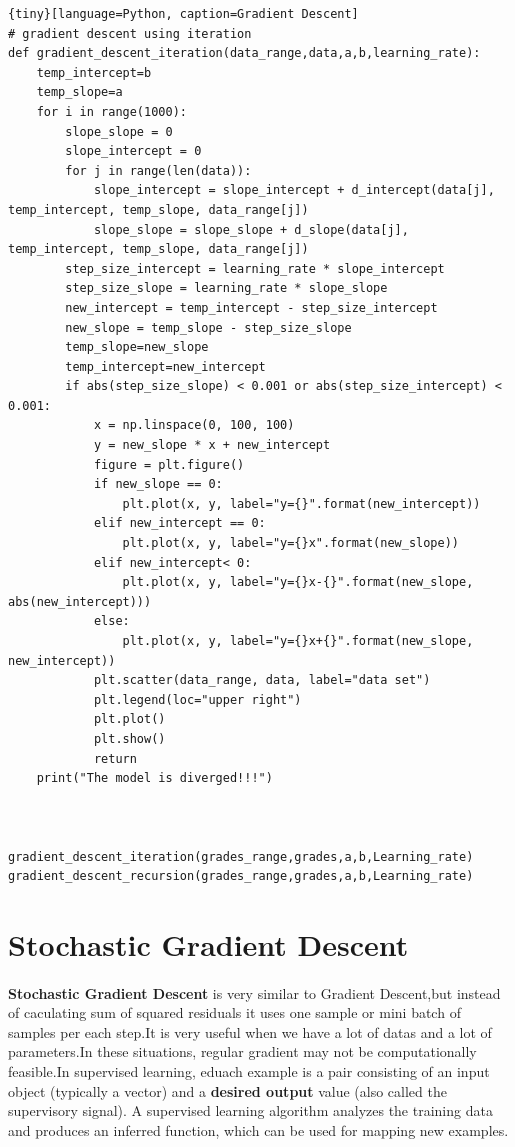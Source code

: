 \documentclass[a4paper,12pt]{article}
\begin{document}
\begin{spacing}{2}
\begin{tiny}
\begin{lstlisting}{tiny}[language=Python, caption=Gradient Descent]
# gradient descent using iteration
def gradient_descent_iteration(data_range,data,a,b,learning_rate):
    temp_intercept=b
    temp_slope=a
    for i in range(1000):
        slope_slope = 0
        slope_intercept = 0
        for j in range(len(data)):
            slope_intercept = slope_intercept + d_intercept(data[j], temp_intercept, temp_slope, data_range[j])
            slope_slope = slope_slope + d_slope(data[j], temp_intercept, temp_slope, data_range[j])
        step_size_intercept = learning_rate * slope_intercept
        step_size_slope = learning_rate * slope_slope
        new_intercept = temp_intercept - step_size_intercept
        new_slope = temp_slope - step_size_slope
        temp_slope=new_slope
        temp_intercept=new_intercept
        if abs(step_size_slope) < 0.001 or abs(step_size_intercept) < 0.001:
            x = np.linspace(0, 100, 100)
            y = new_slope * x + new_intercept
            figure = plt.figure()
            if new_slope == 0:
                plt.plot(x, y, label="y={}".format(new_intercept))
            elif new_intercept == 0:
                plt.plot(x, y, label="y={}x".format(new_slope))
            elif new_intercept< 0:
                plt.plot(x, y, label="y={}x-{}".format(new_slope, abs(new_intercept)))
            else:
                plt.plot(x, y, label="y={}x+{}".format(new_slope, new_intercept))
            plt.scatter(data_range, data, label="data set")
            plt.legend(loc="upper right")
            plt.plot()
            plt.show()
            return
    print("The model is diverged!!!")



gradient_descent_iteration(grades_range,grades,a,b,Learning_rate)
gradient_descent_recursion(grades_range,grades,a,b,Learning_rate)
\end{lstlisting}
\end{tiny}
\section{Stochastic Gradient Descent}
\paragraph{ }\textbf{Stochastic Gradient Descent} is very similar to Gradient Descent,but instead of caculating sum of squared residuals it uses one sample or mini batch of samples per each step.It is very useful when we have a lot of datas and a lot of parameters.In these situations, regular gradient may not be computationally feasible.In supervised learning, eduach example is a pair consisting of an input object (typically a vector) and a \textbf{desired output} value (also called the supervisory signal). A supervised learning algorithm analyzes the training data and produces an inferred function, which can be used for mapping new examples.

\end{spacing}
\end{document}
